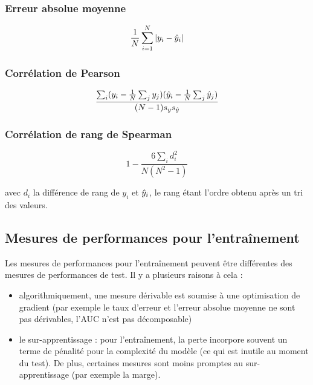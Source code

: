 		\subsubsection{Erreur absolue moyenne}
		
		$$\frac{1}{N} \sum_{i = 1}^N \vert y_i - \hat{y}_i \vert$$
		
		\subsubsection{Corrélation de Pearson}
		
		$$\frac{\sum_i (y_i - \frac{1}{N} \sum_j y_j)(\hat{y}_i - \frac{1}{N} \sum_j \hat{y}_j)}{(N - 1)s_y s_{\hat{y}} }$$
		 		
		\subsubsection{Corrélation de rang de Spearman}
		
		$$1 - \frac{6 \sum_i d_i^2}{N(N^2 - 1)}$$
		
		avec $d_i$ la différence de rang de $y_i$ et $\hat{y}_i$, le rang étant l'ordre obtenu après un tri des valeurs.
		
	\subsection{Mesures de performances pour l'entraînement}
	
	Les mesures de performances pour l'entraînement peuvent être différentes des mesures de performances de test. Il y a plusieurs raisons à cela :
	
	\begin{itemize}
		\item algorithmiquement, une mesure dérivable est soumise à une optimisation de gradient (par exemple le taux d'erreur et l'erreur absolue moyenne ne sont pas dérivables, l'AUC n'est pas décomposable)
		\item le sur-apprentissage : pour l'entraînement, la perte incorpore souvent un terme de pénalité pour la complexité du modèle (ce qui est inutile au moment du test). De plus, certaines mesures sont moins promptes au sur-apprentissage (par exemple la marge).
	\end{itemize}
	